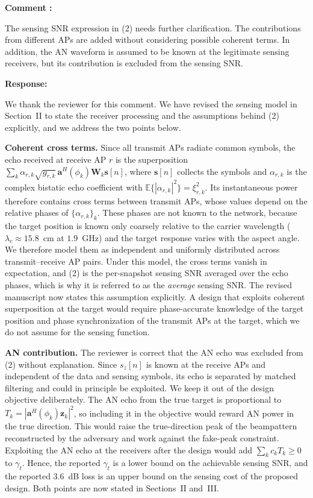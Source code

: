 \documentclass[a4paper,12pt]{article}
\newcounter{reviewcomment}
\newenvironment{reviewcomment}{%
  \stepcounter{reviewcomment}%
  \begin{shaded}
  \textbf{Comment \thereviewcomment:}\par
}{\end{shaded}}
\newenvironment{response}{\par\textbf{Response:}\par}{\par}
\begin{document}
\begin{reviewcomment}
The sensing SNR expression in (2) needs further clarification. The
contributions from different APs are added without considering possible
coherent terms. In addition, the AN waveform is assumed to be known at the
legitimate sensing receivers, but its contribution is excluded from the
sensing SNR.
\end{reviewcomment}
\begin{response}
We thank the reviewer for this comment. We have revised the sensing model in
Section~II to state the receiver processing and the assumptions behind (2)
explicitly, and we address the two points below.

\textbf{Coherent cross terms.} Since all transmit APs radiate common symbols,
the echo received at receive AP $r$ is the superposition
$\sum_k\alpha_{r,k}\sqrt{g_{r,k}}\,\mathbf{a}^H(\phi_k)\mathbf{W}_k\mathbf{s}[n]$,
where $\mathbf{s}[n]$ collects the symbols and $\alpha_{r,k}$ is the complex
bistatic echo coefficient with $\mathbb{E}\{|\alpha_{r,k}|^2\}=\xi_{r,k}^2$.
Its instantaneous power therefore contains cross terms between transmit APs,
whose values depend on the relative phases of $\{\alpha_{r,k}\}_k$. These
phases are not known to the network, because the target position is known
only coarsely relative to the carrier wavelength ($\lambda_c\approx15.8$~cm
at $1.9$~GHz) and the target response varies with the aspect angle. We
therefore model them as independent and uniformly distributed across
transmit--receive AP pairs. Under this model, the cross terms vanish in
expectation, and (2) is the per-snapshot sensing SNR averaged over the echo
phases, which is why it is referred to as the \emph{average} sensing SNR.
The revised manuscript now states this assumption explicitly. A design that
exploits coherent superposition at the target would require phase-accurate
knowledge of the target position and phase synchronization of the transmit
APs at the target, which we do not assume for the sensing function.

\textbf{AN contribution.} The reviewer is correct that the AN echo was
excluded from (2) without explanation. Since $s_z[n]$ is known at the receive
APs and independent of the data and sensing symbols, its echo is separated by
matched filtering and could in principle be exploited. We keep it out of the
design objective deliberately. The AN echo from the true target is
proportional to $T_k=|\mathbf{a}^H(\phi_k)\mathbf{z}_k|^2$, so including it
in the objective would reward AN power in the true direction. This would
raise the true-direction peak of the beampattern reconstructed by the
adversary and work against the fake-peak constraint. Exploiting the AN echo
at the receivers after the design would add $\sum_kc_kT_k\ge0$ to
$\gamma_t$. Hence, the reported $\gamma_t$ is a lower bound on the achievable
sensing SNR, and the reported $3.6$~dB loss is an upper bound on the sensing
cost of the proposed design. Both points are now stated in Sections~II
and~III.
\end{response}
\end{document}

